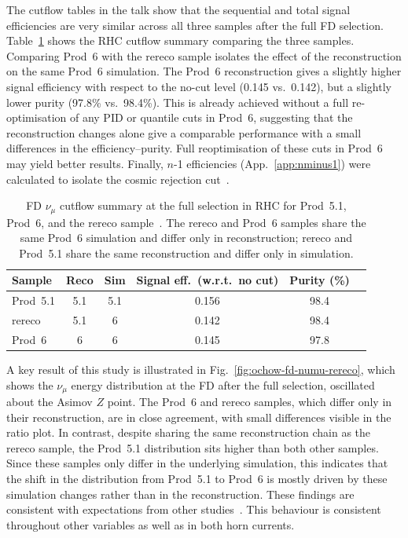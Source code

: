 \documentclass{article}
\begin{document}
The cutflow tables in the talk show that the sequential and total signal efficiencies are very similar across all three samples after the full FD selection.
Table~\ref{tab:fd-numu-cutflow-rhc} shows the RHC cutflow summary comparing the three samples.
Comparing Prod~6 with the rereco sample isolates the effect of the reconstruction on the same Prod~6 simulation.
The Prod~6 reconstruction gives a slightly higher signal efficiency with respect to the no-cut level (0.145 vs.\ 0.142), but a slightly lower purity (97.8\% vs.\ 98.4\%).
This is already achieved without a full re-optimisation of any PID or quantile cuts in Prod~6, suggesting that the reconstruction changes alone give a comparable performance with a small differences in the efficiency--purity. 
Full reoptimisation of these cuts in Prod~6 may yield better results.
Finally, $n$-1 efficiencies (App.~\ref{app:nminus1}) were calculated to isolate the cosmic rejection cut~\cite{ochow-fd-numu-sel}.
\begin{table}[htbp]
    \centering
    \caption{FD $\nu_\mu$ cutflow summary at the full selection in RHC for Prod~5.1, Prod~6, and the rereco sample~\cite{ochow-fd-numu-sel}.
    The rereco and Prod~6 samples share the same Prod~6 simulation and differ only in reconstruction; rereco and Prod~5.1 share the same reconstruction and differ only in simulation.}
    \label{tab:fd-numu-cutflow-rhc}
    \vspace{0.9em}
    \begin{tabular}{lccccc}
        \hline
        Sample & Reco & Sim & Signal eff.\ (w.r.t.\ no cut) & Purity (\%) \\
        \hline
        Prod~5.1  & 5.1 & 5.1 & 0.156 & 98.4 \\
        rereco    & 5.1 & 6   & 0.142 & 98.4 \\
        Prod~6    & 6   & 6   & 0.145 & 97.8 \\
        \hline
    \end{tabular}
\end{table}

A key result of this study is illustrated in Fig.~\ref{fig:ochow-fd-numu-rereco}, which shows the $\nu_\mu$ energy distribution at the FD after the full selection, oscillated about the Asimov $Z$ point.
The Prod~6 and rereco samples, which differ only in their reconstruction, are in close agreement, with small differences visible in the ratio plot.
In contrast, despite sharing the same reconstruction chain as the rereco sample, the Prod~5.1 distribution sits higher than both other samples.
Since these samples only differ in the underlying simulation, this indicates that the shift in the distribution from Prod~5.1 to Prod~6 is mostly driven by these simulation changes rather than in the reconstruction. These findings are consistent with expectations from other studies~\cite{tricia-xsec-prod6}.
This behaviour is consistent throughout other variables as well as in both horn currents.
\end{document}
